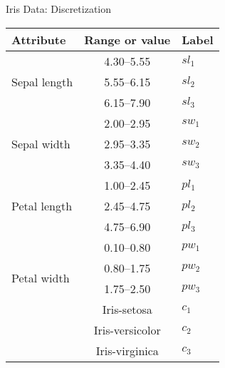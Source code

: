 \begin{frame}{Iris Data: Discretization}
\begin{center}
\begin{tabular}{|l|c|l|}
\hline
Attribute & Range or value & Label \\ \hline
\multirow{3}{*}{Sepal length} & 4.30--5.55 & $sl_1$ \\
& 5.55--6.15 & $sl_2$ \\
& 6.15--7.90 & $sl_3$ \\ \hline
\multirow{3}{*}{Sepal width}  & 2.00--2.95 & $sw_1$ \\
& 2.95--3.35 & $sw_2$ \\
& 3.35--4.40 & $sw_3$ \\ \hline
\multirow{3}{*}{Petal length} & 1.00--2.45 & $pl_1$ \\
& 2.45--4.75 & $pl_2$ \\
& 4.75--6.90 & $pl_3$ \\ \hline
\multirow{4}{*}{Petal width}  & 0.10--0.80 & $pw_1$ \\
& 0.80--1.75 & $pw_2$ \\
& 1.75--2.50 & $pw_3$ \\ \hline
\multirow{3}{*}{Class} & Iris-setosa  & $c_1$ \\
& Iris-versicolor  & $c_2$ \\
& Iris-virginica  & $c_3$ \\ \hline
\end{tabular}%
\end{center}
\end{frame}
  

